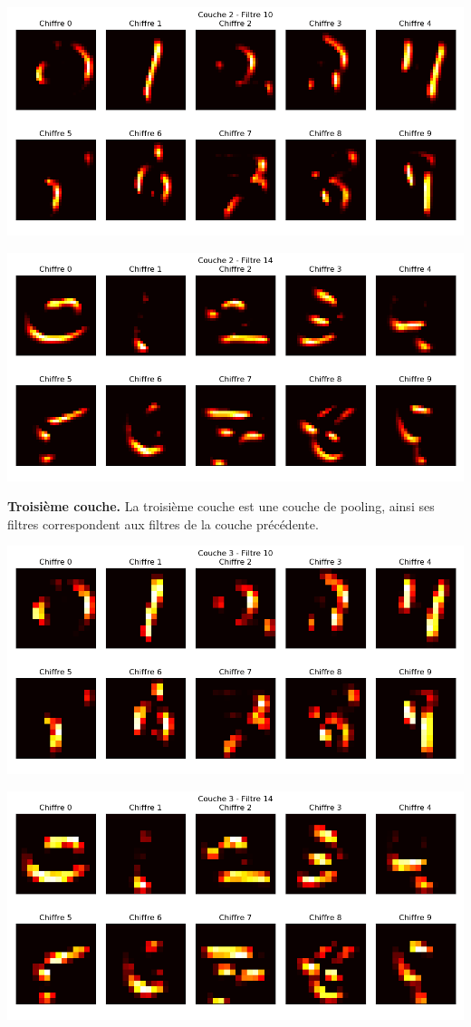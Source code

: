 \documentclass[11pt,class=report,crop=false]{standalone}
\begin{document}
\begin{center}
\includegraphics[scale=\myscale,scale=0.5]{figures/tfconv-viz3-c2-f10}
\end{center}

\begin{center}
\includegraphics[scale=\myscale,scale=0.5]{figures/tfconv-viz3-c2-f14}
\end{center}

\bigskip
\textbf{Troisième couche.}
La troisième couche est une couche de pooling, ainsi ses filtres correspondent aux filtres de la couche précédente. 

\begin{center}
\includegraphics[scale=\myscale,scale=0.5]{figures/tfconv-viz3-c3-f10}
\end{center}

\begin{center}
\includegraphics[scale=\myscale,scale=0.5]{figures/tfconv-viz3-c3-f14}
\end{center}
\end{document}
